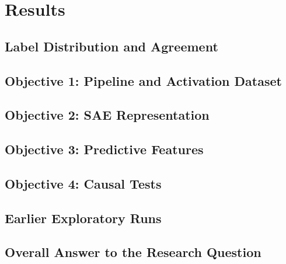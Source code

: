 \chapter{Results}

\section{Label Distribution and Agreement}
\section{Objective 1: Pipeline and Activation Dataset}
\section{Objective 2: SAE Representation}
\section{Objective 3: Predictive Features}
\section{Objective 4: Causal Tests}
\section{Earlier Exploratory Runs}
\section{Overall Answer to the Research Question}

